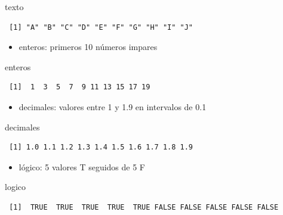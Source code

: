 \documentclass[]{book}
\newenvironment{Shaded}{\begin{snugshade}}{\end{snugshade}}
\newcommand{\NormalTok}[1]{#1}
\providecommand{\tightlist}{%
  \setlength{\itemsep}{0pt}\setlength{\parskip}{0pt}}
\begin{document}
\begin{Shaded}
\begin{Highlighting}[]
\NormalTok{texto}
\end{Highlighting}
\end{Shaded}

\begin{verbatim}
 [1] "A" "B" "C" "D" "E" "F" "G" "H" "I" "J"
\end{verbatim}

\begin{itemize}
\tightlist
\item
  enteros: primeros 10 números impares
\end{itemize}

\begin{Shaded}
\begin{Highlighting}[]
\NormalTok{enteros }
\end{Highlighting}
\end{Shaded}

\begin{verbatim}
 [1]  1  3  5  7  9 11 13 15 17 19
\end{verbatim}

\begin{itemize}
\tightlist
\item
  decimales: valores entre 1 y 1.9 en intervalos de 0.1
\end{itemize}

\begin{Shaded}
\begin{Highlighting}[]
\NormalTok{decimales }
\end{Highlighting}
\end{Shaded}

\begin{verbatim}
 [1] 1.0 1.1 1.2 1.3 1.4 1.5 1.6 1.7 1.8 1.9
\end{verbatim}

\begin{itemize}
\tightlist
\item
  lógico: 5 valores T seguidos de 5 F
\end{itemize}

\begin{Shaded}
\begin{Highlighting}[]
\NormalTok{logico }
\end{Highlighting}
\end{Shaded}

\begin{verbatim}
 [1]  TRUE  TRUE  TRUE  TRUE  TRUE FALSE FALSE FALSE FALSE FALSE
\end{verbatim}
\end{document}
